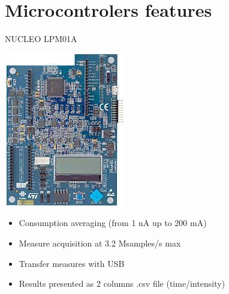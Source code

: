 \documentclass[
	11pt, %
]{beamer}
\begin{document}
\section{Microcontrolers features}

\begin{frame}{NUCLEO LPM01A}
	\centering
    \begin{minipage}{0.4\textwidth}
		\includegraphics[scale = 0.5]{images/lpm01a.jpeg}
	\end{minipage}
	\begin{minipage}{0.50\textwidth}
		\centering
		\begin{itemize}
			\item Consumption averaging (from 1 nA up to 200 mA)
			\item Measure acquisition at 3.2 Msamples/s max
			\item Transfer measures with USB
			\item Results presented as 2 columns .csv file (time/intensity)
		\end{itemize}
		\end{minipage}
\end{frame}
\end{document}
